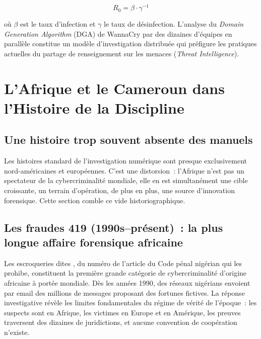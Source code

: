 \begin{equation}
R_0 = \beta \cdot \gamma^{-1}
\label{eq:wannacry-R0}
\end{equation}

où $\beta$ est le taux d'infection et $\gamma$ le taux de désinfection.
L'analyse du \textit{Domain Generation Algorithm} (DGA) de WannaCry par
des dizaines d'équipes en parallèle constitue un modèle d'investigation
distribuée qui préfigure les pratiques actuelles du partage de renseignement
sur les menaces (\textit{Threat Intelligence}).

\section{L'Afrique et le Cameroun dans l'Histoire de la Discipline}

\subsection{Une histoire trop souvent absente des manuels}

Les histoires standard de l'investigation numérique sont presque
exclusivement nord-américaines et européennes. C'est une distorsion~:
l'Afrique n'est pas un spectateur de la cybercriminalité mondiale, elle
en est simultanément une cible croissante, un terrain d'opération, de plus en plus, une source d'innovation forensique. Cette section
comble ce vide historiographique.

\subsection{Les fraudes 419 (1990s--présent)~: la plus longue affaire forensique africaine}

Les escroqueries dites , du numéro de
l'article du Code pénal nigérian qui les prohibe, constituent la première
grande catégorie de cybercriminalité d'origine africaine à portée mondiale.
Dès les années 1990, des réseaux nigérians envoient par email des millions de
messages proposant des fortunes fictives. La réponse investigative révèle les
limites fondamentales du régime de vérité de l'époque~: les suspects sont en
Afrique, les victimes en Europe et en Amérique, les preuves traversent des
dizaines de juridictions, et aucune convention de coopération n'existe.

